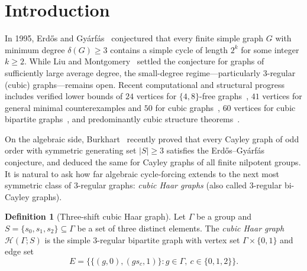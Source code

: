 \documentclass[11pt]{amsart}
\theoremstyle{definition}
\newtheorem{definition}[theorem]{Definition}
\theoremstyle{remark}
\newcommand{\Haar}{\mathcal{H}}
\begin{document}
\section{Introduction}

In 1995, Erd\H{o}s and Gy\'arf\'as~\cite{Erdos1997} conjectured that every finite simple graph $G$ with minimum degree $\delta(G) \ge 3$ contains a simple cycle of length $2^k$ for some integer $k \ge 2$. While Liu and Montgomery~\cite{LiuMontgomery2023} settled the conjecture for graphs of sufficiently large average degree, the small-degree regime---particularly $3$-regular (cubic) graphs---remains open. Recent computational and structural progress includes verified lower bounds of $24$ vertices for $\{4,8\}$-free graphs~\cite{Garcia2026}, $41$ vertices for general minimal counterexamples and $50$ for cubic graphs~\cite{DucoffeDumitru2026}, $60$ vertices for cubic bipartite graphs~\cite{Tranquilli2026}, and predominantly cubic structure theorems~\cite{Carr2026}.

On the algebraic side, Burkhart~\cite{Burkhart2026} recently proved that every Cayley graph of odd order with symmetric generating set $|S| \ge 3$ satisfies the Erd\H{o}s--Gy\'arf\'as conjecture, and deduced the same for Cayley graphs of all finite nilpotent groups. It is natural to ask how far algebraic cycle-forcing extends to the next most symmetric class of $3$-regular graphs: \emph{cubic Haar graphs} (also called $3$-regular bi-Cayley graphs).

\begin{definition}[Three-shift cubic Haar graph]
Let $\Gamma$ be a group and $S = \{s_0, s_1, s_2\} \subseteq \Gamma$ be a set of three distinct elements. The \emph{cubic Haar graph} $\Haar(\Gamma; S)$ is the simple $3$-regular bipartite graph with vertex set $\Gamma \times \{0,1\}$ and edge set
\[
E = \{ \{(g,0), (g s_c, 1)\} : g \in \Gamma,\ c \in \{0,1,2\} \}.
\]
\end{definition}
\end{document}
